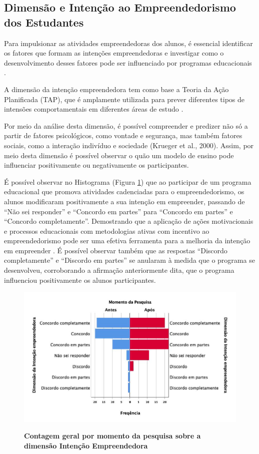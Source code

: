 \subsection{Dimensão e Intenção ao Empreendedorismo dos Estudantes}

Para impulsionar as atividades empreendedoras dos alunos, é essencial identificar os fatores que formam as intenções empreendedoras e investigar como o desenvolvimento desses fatores pode ser influenciado por programas educacionais \cite{gubik_entrepreneurial_2019}. 


A dimensão da intenção empreendedora tem como base a Teoria da Ação Planificada (TAP), que é amplamente utilizada para prever diferentes tipos de intensões comportamentais em diferentes áreas de estudo \cite{oliveira_educacao_2016,ros_psicologisocial_2001}. 

Por meio da análise desta dimensão, é possível  compreender e predizer não só a partir de fatores psicológicos, como vontade e segurança, mas também fatores sociais, como a interação indivíduo e sociedade (Krueger et al., 2000). Assim, por meio desta dimensão é possível observar o quão um modelo de ensino pode influenciar positivamente ou negativamente os participantes.

É possível observar no Histograma (Figura \ref{figura_45}) que ao participar de um programa educacional que promova atividades cadenciadas para o empreendedorismo, os alunos modificaram positivamente a sua intenção em empreender, passando de “Não sei responder” e “Concordo em partes” para “Concordo em partes” e “Concordo completamente”. Demostrando que a aplicação de ações motivacionais e processos educacionais com metodologias ativas  com incentivo ao empreendedorismo pode ser uma efetiva ferramenta para a melhoria da intenção em empreender \cite{fayolle_beyond_2014}. É possível observar também que as respostas “Discordo completamente” e “Discordo em partes” se anularam à medida que o programa se desenvolveu, corroborando a afirmação anteriormente dita, que o programa influenciou positivamente os alunos participantes.



\begin{figure}[H]
\centering
\caption{\textbf{Contagem geral por momento da pesquisa sobre a dimensão Intenção Empreendedora}}
\includegraphics[scale=0.4]{Imagens/dimensao_empreendedora.jpg}
\label{figura_45}
\end{figure}


